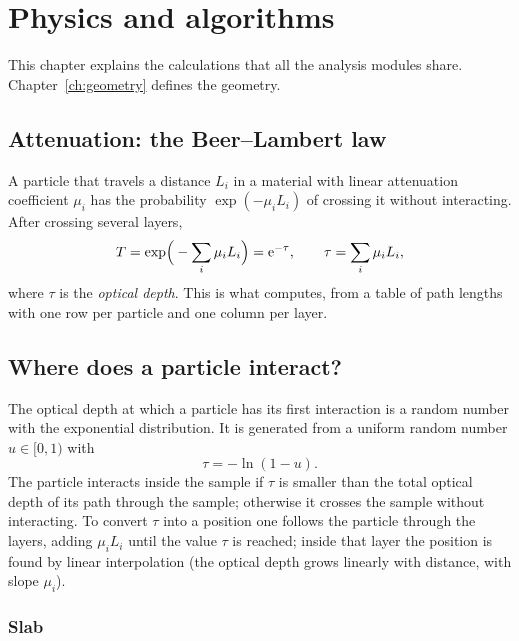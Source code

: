 \chapter{Physics and algorithms}
\label{ch:physics}

This chapter explains the calculations that all the analysis modules share. Chapter~\ref{ch:geometry} defines the geometry.

\section{Attenuation: the Beer--Lambert law}

A particle that travels a distance $L_i$ in a material with linear attenuation coefficient $\mu_i$ has the probability
$\exp(-\mu_iL_i)$ of crossing it without interacting. After crossing several layers,
\begin{equation}
  T = \exp\!\Big(-\sum_i \mu_i L_i\Big) = \operatorname{e}^{-\tau},\qquad \tau=\sum_i\mu_iL_i,
  \label{eq:beer}
\end{equation}
where $\tau$ is the \emph{optical depth}. This is what  computes, from a table of
path lengths with one row per particle and one column per layer.

\section{Where does a particle interact?}

The optical depth at which a particle has its first interaction is a random number with the exponential distribution. It is
generated from a uniform random number $u\in[0,1)$ with
\begin{equation}
  \tau = -\ln(1-u).
  \label{eq:tau}
\end{equation}
The particle interacts inside the sample if $\tau$ is smaller than the total optical depth of its path through the sample;
otherwise it crosses the sample without interacting. To convert $\tau$ into a position one follows the particle through the
layers, adding $\mu_iL_i$ until the value $\tau$ is reached; inside that layer the position is found by linear interpolation
(the optical depth grows linearly with distance, with slope $\mu_i$).

\subsection{Slab}

